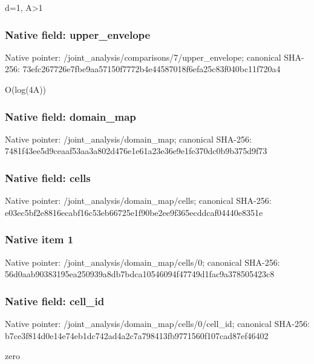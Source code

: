 \documentclass[10pt,a4paper]{article}
\begin{document}
\begingroup\raggedright\sloppy d=\allowbreak{}1,\allowbreak{} A>1\par\endgroup

\subsubsection{Native field: upper\_\allowbreak{}envelope}
Native pointer: /joint\_\allowbreak{}analysis/comparisons/7/upper\_\allowbreak{}envelope; canonical SHA-256: 73efc267726e7fbe9aa57150f7772b4e44587018f6efa25c83f040bc11f720a4

\begingroup\raggedright\sloppy O(log(4A))\par\endgroup

\subsubsection{Native field: domain\_\allowbreak{}map}
Native pointer: /joint\_\allowbreak{}analysis/domain\_\allowbreak{}map; canonical SHA-256: 7481f43ee5d9ceaaf53aa3a802d476e1e61a23e36e9e1fe370dc0b9b375d9f73

\subsubsection{Native field: cells}
Native pointer: /joint\_\allowbreak{}analysis/domain\_\allowbreak{}map/cells; canonical SHA-256: e03ec5bf2e8816ecabf16c53eb66725e1f90be2ee9f365ecddcaf04440e8351e

\subsubsection{Native item 1}
Native pointer: /joint\_\allowbreak{}analysis/domain\_\allowbreak{}map/cells/0; canonical SHA-256: 56d0aab90383195ea250939a8db7bdca10546094f47749d1fac9a378505423c8

\subsubsection{Native field: cell\_\allowbreak{}id}
Native pointer: /joint\_\allowbreak{}analysis/domain\_\allowbreak{}map/cells/0/cell\_\allowbreak{}id; canonical SHA-256: b7ce3f814d0e14e74eb1dc742ad4a2c7a798413fb9771560f107cad87ef46402

\begingroup\raggedright\sloppy zero\par\endgroup
\end{document}
